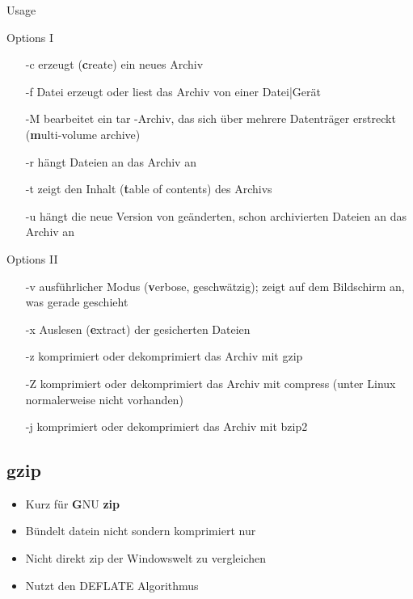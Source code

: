 \documentclass[aspectratio=43]{beamer}
\begin{document}
\begin{frame} 
	\begin{exampleblock}{Usage}
	\end{exampleblock}

	\begin{exampleblock}{Options I}
	\begin{itemize}
	\item[-c] erzeugt (\textbf{c}reate) ein neues Archiv
	\item[-f] Datei erzeugt oder liest das Archiv von einer Datei|Gerät
	\item[-M] bearbeitet ein tar -Archiv, das sich über mehrere Datenträger erstreckt (\textbf{m}ulti-volume archive)
	\item[-r] hängt Dateien an das Archiv an
	\item[-t]  zeigt den Inhalt (\textbf{t}able of contents) des Archivs
	\item[-u] hängt die neue Version von geänderten, schon archivierten Dateien an das Archiv an
	\end{itemize}
	\end{exampleblock}
\end{frame}

\begin{frame} 
	\begin{exampleblock}{Options II}
	\begin{itemize}

	\item[-v] ausführlicher Modus (\textbf{v}erbose, geschwätzig); zeigt auf dem Bildschirm an,
was gerade geschieht
	\item[-x]
 Auslesen (\textbf{e}xtract) der gesicherten Dateien
	\item[-z] komprimiert oder dekomprimiert das Archiv mit gzip
\item[-Z] komprimiert oder dekomprimiert das Archiv mit compress (unter Linux normalerweise nicht vorhanden)
\item[-j] komprimiert oder dekomprimiert das Archiv mit bzip2
	\end{itemize}
	\end{exampleblock}

	
\end{frame}


\subsection{gzip}
\begin{frame} 
	\begin{block}{} 
	\begin{itemize}
	\item Kurz für \textbf{G}NU \textbf{zip}
	\item Bündelt datein nicht sondern komprimiert nur
	\item Nicht direkt zip der Windowswelt zu vergleichen
	\item Nutzt den DEFLATE Algorithmus
	\end{itemize}
	\end{block}
\end{frame}
\end{document}
